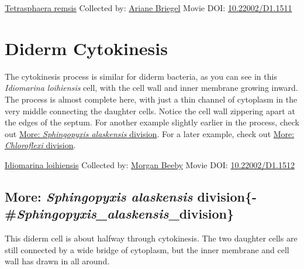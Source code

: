 \documentclass[]{tufte-book}
\begin{document}
\hypertarget{htmlwidget-25f60488c1380b54301b}{}

\label{fig:5-5}\protect\hyperlink{tree}{Tetrasphaera remsis} Collected by: \protect\hyperlink{ariane_briegel}{Ariane Briegel} Movie DOI: \href{https://doi.org/10.22002/D1.1511}{10.22002/D1.1511}

\hypertarget{diderm-cytokinesis}{%
\section{Diderm Cytokinesis}\label{diderm-cytokinesis}}

The cytokinesis process is similar for diderm bacteria, as you can see in this \emph{Idiomarina loihiensis} cell, with the cell wall and inner membrane growing inward. The process is almost complete here, with just a thin channel of cytoplasm in the very middle connecting the daughter cells. Notice the cell wall zippering apart at the edges of the septum. For another example slightly earlier in the process, check out \protect\hyperlink{ux2aSphingopyxis_alaskensisux2a_division}{More: \emph{Sphingopyxis alaskensis} division}. For a later example, check out \protect\hyperlink{ux2aChloroflexiux2a_division}{More: \emph{Chloroflexi} division}.



\hypertarget{htmlwidget-28ead42b761a343585e5}{}

\label{fig:5-6}\protect\hyperlink{tree}{Idiomarina loihiensis} Collected by: \protect\hyperlink{morgan_beeby}{Morgan Beeby} Movie DOI: \href{https://doi.org/10.22002/D1.1512}{10.22002/D1.1512}

\hypertarget{more-sphingopyxis-alaskensis-division-sphingopyxis_alaskensis_division}{%
\subsection{\texorpdfstring{More: \emph{Sphingopyxis alaskensis} division\{-\#\emph{Sphingopyxis\_alaskensis}\_division\}}{More: Sphingopyxis alaskensis division\{-\#Sphingopyxis\_alaskensis\_division\}}}\label{more-sphingopyxis-alaskensis-division-sphingopyxis_alaskensis_division}}

This diderm cell is about halfway through cytokinesis. The two daughter cells are still connected by a wide bridge of cytoplasm, but the inner membrane and cell wall has drawn in all around.



\hypertarget{htmlwidget-21594ef04b18c16c3194}{}
\end{document}
